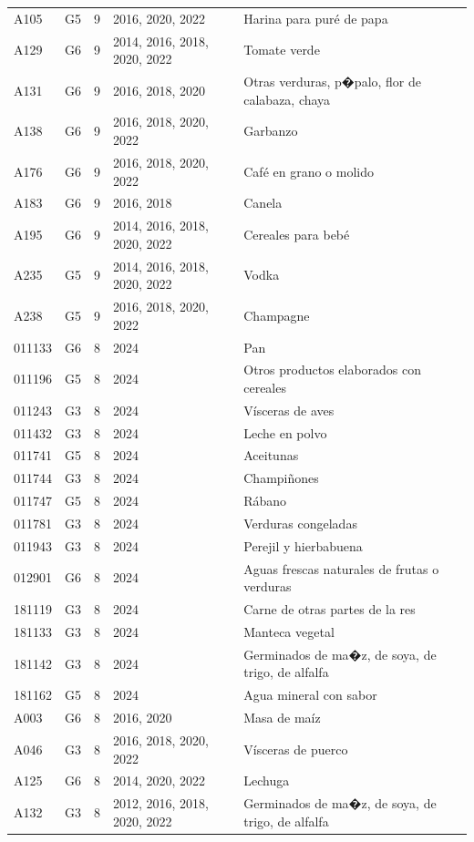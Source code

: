 \begin{table}[ht]
\begin{tabular}{llrll}
  A105 & G5 &   9 & 2016, 2020, 2022 & Harina para puré de papa \\ 
  A129 & G6 &   9 & 2014, 2016, 2018, 2020, 2022 & Tomate verde \\ 
  A131 & G6 &   9 & 2016, 2018, 2020 & Otras verduras, p�palo, flor de calabaza, chaya \\ 
  A138 & G6 &   9 & 2016, 2018, 2020, 2022 & Garbanzo \\ 
  A176 & G6 &   9 & 2016, 2018, 2020, 2022 & Café en grano o molido \\ 
  A183 & G6 &   9 & 2016, 2018 & Canela \\ 
  A195 & G6 &   9 & 2014, 2016, 2018, 2020, 2022 & Cereales para bebé \\ 
  A235 & G5 &   9 & 2014, 2016, 2018, 2020, 2022 & Vodka \\ 
  A238 & G5 &   9 & 2016, 2018, 2020, 2022 & Champagne \\ 
  011133 & G6 &   8 & 2024 & Pan \\ 
  011196 & G5 &   8 & 2024 & Otros productos elaborados con cereales \\ 
  011243 & G3 &   8 & 2024 & Vísceras de aves \\ 
  011432 & G3 &   8 & 2024 & Leche en polvo \\ 
  011741 & G5 &   8 & 2024 & Aceitunas \\ 
  011744 & G3 &   8 & 2024 & Champiñones \\ 
  011747 & G5 &   8 & 2024 & Rábano \\ 
  011781 & G3 &   8 & 2024 & Verduras congeladas \\ 
  011943 & G3 &   8 & 2024 & Perejil y hierbabuena \\ 
  012901 & G6 &   8 & 2024 & Aguas frescas naturales de frutas o verduras \\ 
  181119 & G3 &   8 & 2024 & Carne de otras partes de la res \\ 
  181133 & G3 &   8 & 2024 & Manteca vegetal \\ 
  181142 & G3 &   8 & 2024 & Germinados de ma�z, de soya, de trigo, de alfalfa \\ 
  181162 & G5 &   8 & 2024 & Agua mineral con sabor \\ 
  A003 & G6 &   8 & 2016, 2020 & Masa de maíz \\ 
  A046 & G3 &   8 & 2016, 2018, 2020, 2022 & Vísceras de puerco \\ 
  A125 & G6 &   8 & 2014, 2020, 2022 & Lechuga \\ 
  A132 & G3 &   8 & 2012, 2016, 2018, 2020, 2022 & Germinados de ma�z, de soya, de trigo, de alfalfa \\ 

\end{tabular}
\end{table}
